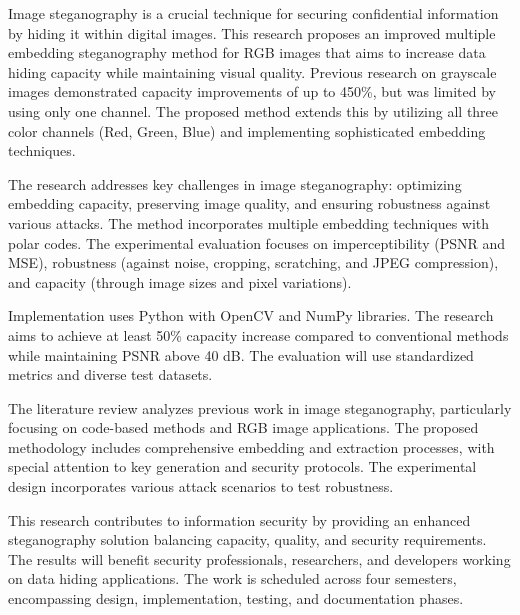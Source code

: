 \documentclass{ittelkom}
\begin{document}


Image steganography is a crucial technique for securing confidential
information by hiding it within digital images. This research proposes an
improved multiple embedding steganography method for RGB images that aims to
increase data hiding capacity while maintaining visual quality. Previous
research on grayscale images demonstrated capacity improvements of up to 450\%,
but was limited by using only one channel. The proposed method extends this by
utilizing all three color channels (Red, Green, Blue) and implementing
sophisticated embedding techniques.

The research addresses key challenges in image steganography: optimizing
embedding capacity, preserving image quality, and ensuring robustness against
various attacks. The method incorporates multiple embedding techniques with
polar codes. The experimental evaluation focuses on imperceptibility (PSNR and
MSE), robustness (against noise, cropping, scratching, and JPEG compression),
and capacity (through image sizes and pixel variations).

Implementation uses Python with OpenCV and NumPy libraries. The research aims
to achieve at least 50\% capacity increase compared to conventional methods
while maintaining PSNR above 40 dB. The evaluation will use standardized
metrics and diverse test datasets.

The literature review analyzes previous work in image steganography,
particularly focusing on code-based methods and RGB image applications. The
proposed methodology includes comprehensive embedding and extraction processes,
with special attention to key generation and security protocols. The
experimental design incorporates various attack scenarios to test robustness.

This research contributes to information security by providing an enhanced
steganography solution balancing capacity, quality, and security requirements.
The results will benefit security professionals, researchers, and developers
working on data hiding applications. The work is scheduled across four
semesters, encompassing design, implementation, testing, and documentation
phases.

\newpage
\end{document}
